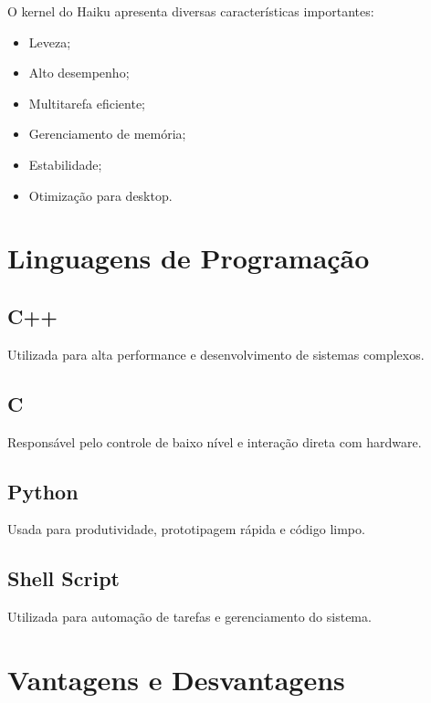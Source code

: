 \documentclass[12pt,a4paper]{article}
\begin{document}
O kernel do Haiku apresenta diversas características importantes:

\begin{itemize}
    \item Leveza;
    \item Alto desempenho;
    \item Multitarefa eficiente;
    \item Gerenciamento de memória;
    \item Estabilidade;
    \item Otimização para desktop.
\end{itemize}


\section{Linguagens de Programação}

\subsection{C++}

Utilizada para alta performance e desenvolvimento de sistemas complexos.

\subsection{C}

Responsável pelo controle de baixo nível e interação direta com hardware.

\subsection{Python}

Usada para produtividade, prototipagem rápida e código limpo.

\subsection{Shell Script}

Utilizada para automação de tarefas e gerenciamento do sistema.


\section{Vantagens e Desvantagens}
\end{document}
